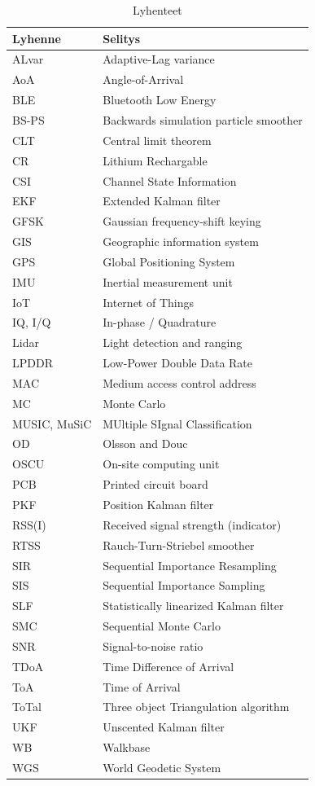 \documentclass[
  12pt,
  a4paper, twoside]{book}
\begin{document}
\begin{table}

\caption{\label{tab:lyhenteet-ja-symbolit}Lyhenteet}
\centering
\begin{tabular}[t]{ll}
\toprule
Lyhenne & Selitys\\
\midrule
ALvar & Adaptive-Lag variance\\
AoA & Angle-of-Arrival\\
BLE & Bluetooth Low Energy\\
BS-PS & Backwards simulation particle smoother\\
CLT & Central limit theorem\\
\addlinespace
CR & Lithium Rechargable\\
CSI & Channel State Information\\
EKF & Extended Kalman filter\\
GFSK & Gaussian frequency-shift keying\\
GIS & Geographic information system\\
\addlinespace
GPS & Global Positioning System\\
IMU & Inertial measurement unit\\
IoT & Internet of Things\\
IQ, I/Q & In-phase / Quadrature\\
Lidar & Light detection and ranging\\
\addlinespace
LPDDR & Low-Power Double Data Rate\\
MAC & Medium access control address\\
MC & Monte Carlo\\
MUSIC, MuSiC & MUltiple SIgnal Classification\\
OD & Olsson and Douc\\
\addlinespace
OSCU & On-site computing unit\\
PCB & Printed circuit board\\
PKF & Position Kalman filter\\
RSS(I) & Received signal strength (indicator)\\
RTSS & Rauch-Turn-Striebel smoother\\
\addlinespace
SIR & Sequential Importance Resampling\\
SIS & Sequential Importance Sampling\\
SLF & Statistically linearized Kalman filter\\
SMC & Sequential Monte Carlo\\
SNR & Signal-to-noise ratio\\
\addlinespace
TDoA & Time Difference of Arrival\\
ToA & Time of Arrival\\
ToTal & Three object Triangulation algorithm\\
UKF & Unscented Kalman filter\\
WB & Walkbase\\
\addlinespace
WGS & World Geodetic System\\
\bottomrule
\end{tabular}
\end{table}
\end{document}
